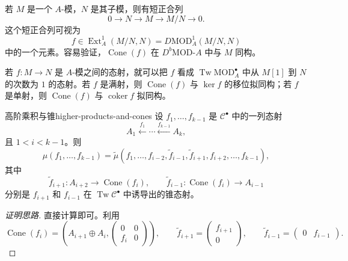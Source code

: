 \begin{example}[短正合列与锥]\label{ex:exact-sequence-cone}
若 $M$ 是一个 $A$-模，$N$ 是其子模，则有短正合列
\[
  0\longrightarrow N\longrightarrow M\longrightarrow M/N\longrightarrow0.
\]
这个短正合列可视为
\[
  f\in\operatorname{Ext}_A^1(M/N,N)
   =D\mathrm{MOD}_A^1(M/N,N)
\]
中的一个元素。容易验证，$\operatorname{Cone}(f)$ 在 $D^b\mathrm{MOD}\text{-}A$ 中与 $M$ 同构。
\end{example}

\begin{example}[单射或满射的锥]\label{ex:cone-monomorphism-epimorphism}
若 $f\colon M\to N$ 是 $A$-模之间的态射，就可以把 $f$ 看成 $\operatorname{Tw}\mathrm{MOD}_A^\bullet$ 中从 $M[1]$ 到 $N$ 的次数为 $1$ 的态射。若 $f$ 是满射，则 $\operatorname{Cone}(f)$ 与 $\ker f$ 的移位拟同构；若 $f$ 是单射，则 $\operatorname{Cone}(f)$ 与 $\operatorname{coker}f$ 拟同构。
\end{example}

\begin{lemma}{高阶乘积与锥}{higher-products-and-cones}
设 $f_1,\ldots,f_{k-1}$ 是 $\mathcal C^\bullet$ 中的一列态射
\[
  A_1\xleftarrow{f_1}\cdots\xleftarrow{f_{k-1}}A_k,
\]
且 $1<i<k-1$。则
\[
  \mu(f_1,\ldots,f_{k-1})
  =
  \widetilde\mu
  (f_1,\ldots,f_{i-2},\widetilde f_{i-1},
    \widetilde f_{i+1},f_{i+2},\ldots,f_{k-1}),
\]
其中
\[
  \widetilde f_{i+1}\colon A_{i+2}\to\operatorname{Cone}(f_i),
  \qquad
  \widetilde f_{i-1}\colon\operatorname{Cone}(f_i)\to A_{i-1}
\]
分别是 $f_{i+1}$ 和 $f_{i-1}$ 在 $\operatorname{Tw}\mathcal C^\bullet$ 中诱导出的锥态射。
\end{lemma}
\begin{proof}[证明思路]
直接计算即可。利用
\[
  \operatorname{Cone}(f_i)
  =\left(A_{i+1}\oplus A_i,
    \begin{pmatrix}0&0\\f_i&0\end{pmatrix}\right),
\qquad
  \widetilde f_{i+1}=\begin{pmatrix}f_{i+1}\\0\end{pmatrix},
\qquad
  \widetilde f_{i-1}=\begin{pmatrix}0&f_{i-1}\end{pmatrix}.
\]
\end{proof}

